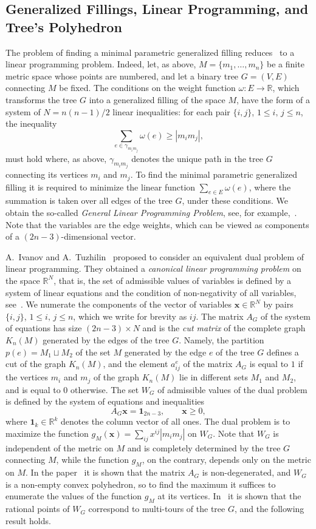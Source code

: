 \documentclass[10pt]{article}
\theoremstyle{plain}
\theoremstyle{definition}
\def\one{\mathbf{1}}
\def\bx{\boldsymbol{x}}
\def\:{\colon}
\def\g{\gamma}
\def\om{\omega}
\newcommand{\R}{{\mathbb R}}
\begin{document}
\subsection{Generalized Fillings, Linear Programming, and Tree's Polyhedron}
The problem of finding a minimal parametric generalized filling reduces~\cite{IT_MSb} to a linear programming problem. Indeed, let, as above, $M=\{m_1,\ldots,m_n\}$ be a finite metric space whose points are numbered, and let a binary tree $G=(V,E)$ connecting $M$ be fixed. The conditions on the weight function $\om\:E\to\R$, which transforms the tree $G$ into a generalized filling of the space $M$, have the form of a system of $N=n(n-1)/2$ linear inequalities: for each pair $\{i,j\}$, $1\le i,\,j\le n$, the inequality
$$
\sum_{e\in\g_{m_im_j}}\om(e)\ge|m_im_j|,
$$
must hold where, as above, $\g_{m_im_j}$ denotes the unique path in the tree $G$ connecting its vertices $m_i$ and $m_j$. To find the minimal parametric generalized filling it is required to minimize the linear function $\sum_{e\in E}\om(e)$, where the summation is taken over all edges of the tree $G$, under these conditions. We obtain the so-called \emph{General Linear Programming Problem}, see, for example,~\cite{VasIv}. Note that the variables are the edge weights, which can be viewed as components of a $(2n-3)$-dimensional vector.
 
A.~Ivanov and A.~Tuzhilin~\cite{IT_LP} proposed to consider an equivalent dual problem of linear programming. They obtained a \emph{canonical linear programming problem\/} on the space $\R^N$, that is, the set of admissible values of variables is defined by a system of linear equations and the condition of non-negativity of all variables, see~\cite{VasIv}. We numerate the components of the vector of variables $\bx\in\R^N$ by pairs $\{i,j\}$, $1\le i,\,j\le n$, which we write for brevity as $ij$. The matrix $A_G$ of the system of equations has size $(2n-3)\times N$ and is the \emph{cut matrix\/} of the complete graph $K_n(M)$ generated by the edges of the tree $G$. Namely, the partition $p(e)=M_1\sqcup M_2$ of the set $M$ generated by the edge $e$ of the tree $G$ defines a cut of the graph $K_n(M)$, and the element $a_{ij}^e$ of the matrix $A_G$ is equal to $1$ if the vertices $m_i$ and $m_j$ of the graph $K_n(M)$ lie in different sets $M_1$ and $M_2$, and is equal to $0$ otherwise. The set $W_G$ of admissible values of the dual problem is defined by the system of equations and inequalities
$$
A_G\bx=\one_{2n-3},\qquad \bx\ge0,
$$
where $\one_k\in\R^k$ denotes the column vector of all ones. The dual problem is to maximize the function $g_M(\bx)=\sum_{ij}x^{ij}|m_im_j|$ on $W_G$. Note that $W_G$ is independent of the metric on $M$ and is completely determined by the tree $G$ connecting $M$, while the function $g_M$, on the contrary, depends only on the metric on $M$. In the paper~\cite{IT_LP} it is shown that the matrix $A_G$ is non-degenerated, and $W_G$ is a non-empty convex polyhedron, so to find the maximum it suffices to enumerate the values of the function $g_M$ at its vertices. In~\cite{IT_LP} it is shown that the rational points of $W_G$ correspond to multi-tours of the tree $G$, and the following result holds.
\end{document}
